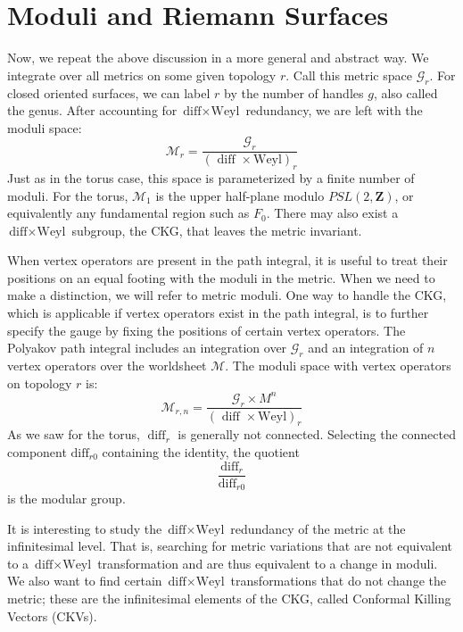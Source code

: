 \section{Moduli and Riemann Surfaces}\label{sec:5.2}

Now, we repeat the above discussion in a more general and abstract way. We integrate over all metrics on some given topology $r$. Call this metric space $\mathscr{G}_{r}$. For closed oriented surfaces, we can label $r$ by the number of handles $g$, also called the genus. After accounting for $\text{diff} \times \text{Weyl}$ redundancy, we are left with the moduli space:
\begin{equation}
	\mathscr{M}_{r}=\frac{\mathscr{G}_{r}}{(\text { diff } \times \mathrm{Weyl})_{r}}
\end{equation}
Just as in the torus case, this space is parameterized by a finite number of moduli. For the torus, $\mathscr{M}_{1}$ is the upper half-plane modulo $PSL(2, \mathbf{Z})$, or equivalently any fundamental region such as $F_{0}$. There may also exist a $\text{diff} \times \text{Weyl}$ subgroup, the CKG, that leaves the metric invariant.

When vertex operators are present in the path integral, it is useful to treat their positions on an equal footing with the moduli in the metric. When we need to make a distinction, we will refer to metric moduli. One way to handle the CKG, which is applicable if vertex operators exist in the path integral, is to further specify the gauge by fixing the positions of certain vertex operators. The Polyakov path integral includes an integration over $\mathscr{G}_{r}$ and an integration of $n$ vertex operators over the worldsheet $\mathscr{M}$. The moduli space with vertex operators on topology $r$ is:
\begin{equation}
	\mathscr{M}_{r, n}=\frac{\mathscr{G}_{r} \times M^{n}}{(\text { diff } \times \mathrm{Weyl})_{r}}
\end{equation}
As we saw for the torus, $\operatorname{diff}_{r}$ is generally not connected. Selecting the connected component $\text{diff}_{r 0}$ containing the identity, the quotient
\begin{equation}
	\frac{\operatorname{diff}_{r}}{\operatorname{diff}_{r 0}}
\end{equation}
is the modular group.

It is interesting to study the $\text{diff} \times \text{Weyl}$ redundancy of the metric at the infinitesimal level. That is, searching for metric variations that are not equivalent to a $\text{diff} \times \text{Weyl}$ transformation and are thus equivalent to a change in moduli. We also want to find certain $\text{diff} \times \text{Weyl}$ transformations that do not change the metric; these are the infinitesimal elements of the CKG, called Conformal Killing Vectors (CKVs).

